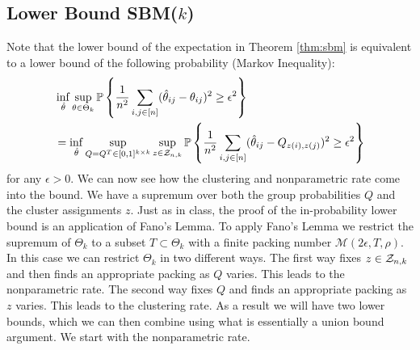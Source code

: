 \documentclass[11pt]{article}
\begin{document}
\subsection{Lower Bound SBM($k$)} \label{sec:lower_sbm}
Note that the lower bound of the expectation in Theorem \ref{thm:sbm} is equivalent to a lower bound of the following probability (Markov Inequality):
\begin{equation}
\begin{aligned}
&\inf_{\hat{\theta}} \sup_{\theta \in \Theta_k} \mathbb{P} \left\{ \frac{1}{n^2}\sum_{i,j \in \lbrack n\rbrack} (\hat{\theta}_{ij} - \theta_{ij})^2 \geq \epsilon^2\right\}  \\
&= \inf_{\hat{\theta}} \sup_{Q = Q^T \in [0, 1]^{k \times k}} \sup_{z \in \mathcal{Z}_{n,k}} \mathbb{P} \left\{ \frac{1}{n^2}\sum_{i,j \in \lbrack n\rbrack} (\hat{\theta}_{ij} - Q_{z(i), z(j)})^2 \geq \epsilon^2\right\}
\end{aligned}
\end{equation}
for any $\epsilon > 0$. We can now see how the clustering and nonparametric rate come into the bound. We have a supremum over both the group probabilities $Q$ and the cluster assignments $z$. Just as in class, the proof of the in-probability lower bound is an application of Fano's Lemma. To apply Fano's Lemma we restrict the supremum of $\Theta_k$ to a subset $T \subset \Theta_k$ with a finite packing number $\mathcal{M}(2 \epsilon, T, \rho)$. In this case we can restrict $\Theta_k$ in two different ways. The first way fixes $z \in \mathcal{Z}_{n,k}$ and then finds an appropriate packing as $Q$ varies. This leads to the nonparametric rate. The second way fixes $Q$ and finds an appropriate packing as $z$ varies. This leads to the clustering rate. As a result we will have two lower bounds, which we can then combine using what is essentially a union bound argument. We start with the nonparametric rate.
\end{document}
